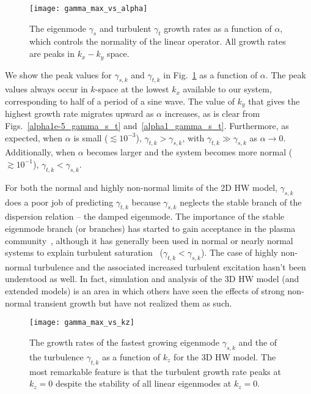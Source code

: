 \documentclass[letter,scriptaddress,twocolumn, prl,showkeys]{revtex4}
\begin{document}
\begin{figure}
\centerline{\texttt{[image: gamma\_max\_vs\_alpha]}}
\caption{The eigenmode $\gamma_{s}$ and turbulent $\gamma_{t}$ growth rates as a function of $\alpha$, which controls the normality of the linear operator. All growth rates are peaks in $k_x-k_y$ space.}
\label{gamma_max_vs_alpha}
\end{figure}

We show the peak values for $\gamma_{s,k}$ and $\gamma_{t,k}$ in Fig.~\ref{gamma_max_vs_alpha} as a function of $\alpha$. The peak values always occur in $k$-space
at the lowest $k_x$ available to our system, corresponding to half of a period of a sine wave. The value of $k_y$ that gives the highest growth rate migrates upward as $\alpha$ increases,
as is clear from Figs.~\ref{alpha1e-5_gamma_s_t} and~\ref{alpha1_gamma_s_t}. Furthermore, as expected, when $\alpha$ is small ($\lesssim 10^{-3}$), $\gamma_{t,k} > \gamma_{s,k}$, with
$\gamma_{t,k} \gg \gamma_{s,k}$ as $\alpha \to 0$. Additionally, when $\alpha$ becomes larger and the system becomes more normal ($\gtrsim 10^{-1}$), $\gamma_{t,k} < \gamma_{s,k}$.

For both the normal and highly non-normal limits of the 2D HW model, $\gamma_{s,k}$ does a poor job of predicting $\gamma_{t,k}$ because $\gamma_{s,k}$ neglects the stable branch of the
dispersion relation -- the damped eigenmode. The importance of the stable eigenmode branch (or branches) 
has started to gain acceptance in the plasma community~\cite{baver2002}, although it has generally been used in normal
or nearly normal systems to explain turbulent saturation~\cite{terry2006b,hatch2011,makwana2011} ($\gamma_{t,k} < \gamma_{s,k}$). 
The case of highly non-normal turbulence and the associated increased turbulent excitation
hasn't been understood as well. In fact, simulation and analysis of the 3D HW model (and extended models) is an area in which others have seen the effects of strong non-normal transient growth
but have not realized them as such.


\begin{figure}
\centerline{\texttt{[image: gamma\_max\_vs\_kz]}}
\caption{The growth rates of the fastest growing eigenmode $\gamma_{s,k}$ and the of the turbulence $\gamma_{t,k}$ as a function of $k_z$ for the 3D HW model. The most remarkable feature is
that the turbulent growth rate peaks at $k_z=0$ despite the stability of all linear eigenmodes at $k_z=0$.}
\label{gamma_max_vs_kz}
\end{figure}
\end{document}
